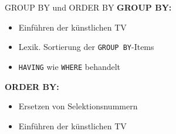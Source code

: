 \documentclass{beamer}
\begin{document}
   


%
%

\begin{frame}[fragile]{GROUP BY und ORDER BY}
\textbf{GROUP BY:}
\begin{itemize}
\item Einführen der künstlichen TV
\item Lexik. Sortierung der \verb|GROUP BY|-Items
\item \verb|HAVING| wie \verb|WHERE| behandelt
\end{itemize}
\textbf{ORDER BY:}
\begin{itemize}
\item Ersetzen von Selektionsnummern 
\item Einführen der künstlichen TV
\end{itemize}
\end{frame}
\end{document}
